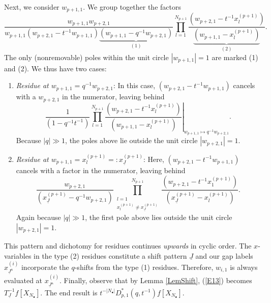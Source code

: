 \documentclass{amsart}
\renewcommand{\triangle}{\vartriangle}
\newcommand{\Ju}{{\underline{J}}}
\providecommand{\blacktriangle}{\mdblktriangle}
\theoremstyle{remark}
\numberwithin{thm}{section}
\numberwithin{equation}{section}
\begin{document}
Next, we consider $w_{p+1,1}$.
We group together the factors
\[
\frac{ w_{p+1,1}w_{p+2,1}}
{w_{p+1,1}
\left( w_{p+2,1}-t^{-1}w_{p+1,1} \right)
\underbrace{\left( w_{p+1,1}-q^{-1}w_{p+2,1} \right)}_{(1)}
}
\prod_{l=1}^{N_{p+1}}
\frac{\left( w_{p+2,1}-t^{-1}x_{l}^{(p+1)} \right)}
{\underbrace{\left( w_{p+1,1}-x_{l}^{(p+1)} \right)}_{(2)}}.
\]
The only (nonremovable) poles within the unit circle $|w_{p+1,1}|=1$ are marked (1) and (2).
We thus have two cases:
\begin{enumerate}
\item \textit{Residue at $w_{p+1,1}=q^{-1}w_{p+2,1}$}: In this case, $\left( w_{p+2,1}-t^{-1}w_{p+1,1} \right)$ cancels with a $w_{p+2,1}$ in the numerator, leaving behind
\[
\frac{1}
{\left(1 -q^{-1}t^{-1} \right)}
\left.
\prod_{l=1}^{N_{p+1}}
\frac{
\left( w_{p+2,1}-t^{-1}x_{l}^{(p+1)} \right)}
{\left( w_{p+1,1}-x_{l}^{(p+1)} \right)}\right|_{w_{p+1,1}\mapsto q^{-1}w_{p+2,1}}.
\]
Because $|q|\gg 1$, the poles above lie outside the unit circle $|w_{p+2,1}|=1$.
\item \textit{Residue at $w_{p+1,1}=x_{l}^{(p+1)}=:x_{\Ju}^{(p+1)}$}: Here, $\left( w_{p+2,1}-t^{-1}w_{p+1,1} \right)$ cancels with a factor in the numerator, leaving behind
\begin{equation}
\frac{w_{p+2,1}}{\left(x_{\Ju}^{(p+1)}-q^{-1}w_{p+2,1}\right)}
\prod_{\substack{l=1\\x_{l}^{(p+1)}\not=x_{\Ju}^{(p+1)}}}^{N_{p+1}}
\frac{\left( w_{p+2,1}-t^{-1}x_{1}^{(p+1)} \right)}
{\left( x_{\Ju}^{(p+1)}-x_{l}^{(p+1)} \right)}.
\label{XResE}
\end{equation}
Again because $|q|\gg 1$, the first pole above lies outside the unit circle $|w_{p+2,1}|=1$.
\end{enumerate}
This pattern and dichotomy for residues continues \textit{upwards} in cyclic order.
The $x$-variables in the type (2) residues constitute a shift pattern $\Ju$ and our gap labels $x_{\Ju^\triangle}^{(i)}$ incorporate the $q$-shifts from the type (1) residues.
Therefore, $w_{i,1}$ is always evaluated at $x_{\Ju^\triangle}^{(i)}$.
Finally, observe that by Lemma \ref{LemShift}, (\ref{E13}) becomes $T_{\Ju}^{-1}f\left[ X_{N_\bullet} \right]$.
The end result is $t^{-|N_\bullet|}D_{p,1}^*(q,t^{-1})f\left[ X_{N_\bullet} \right]$.
\end{document}
